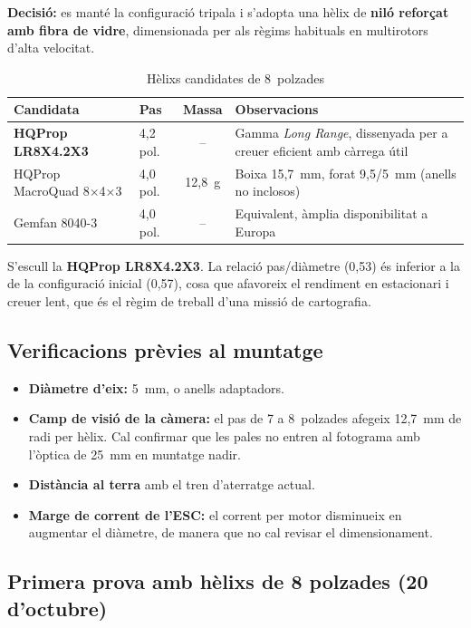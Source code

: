 \textbf{Decisió:} es manté la configuració tripala i s'adopta una hèlix de \textbf{niló reforçat amb fibra de vidre}, dimensionada per als règims habituals en multirotors d'alta velocitat.

\begin{table}[H]
    \centering
    \caption{Hèlixs candidates de 8~polzades}
    \label{tab:helix-candidates}
    \small
    \begin{tabular}{llcP{6.4cm}}
        \toprule
        Candidata & Pas & Massa & Observacions \\
        \midrule
        \textbf{HQProp LR8X4.2X3} & 4,2 pol. & -- & Gamma \emph{Long Range}, dissenyada per a creuer eficient amb càrrega útil \\
        HQProp MacroQuad 8$\times$4$\times$3 & 4,0 pol. & 12,8~g & Boixa 15,7~mm, forat 9,5/5~mm (anells no inclosos) \\
        Gemfan 8040-3 & 4,0 pol. & -- & Equivalent, àmplia disponibilitat a Europa \\
        \bottomrule
    \end{tabular}
\end{table}

S'escull la \textbf{HQProp LR8X4.2X3}. La relació pas/diàmetre (0,53) és inferior a la de la configuració inicial (0,57), cosa que afavoreix el rendiment en estacionari i creuer lent, que és el règim de treball d'una missió de cartografia.

\subsection{Verificacions prèvies al muntatge}
\label{subsec:propulsor-verificacions}

\begin{itemize}
    \item \textbf{Diàmetre d'eix:} 5~mm, o anells adaptadors.
    \item \textbf{Camp de visió de la càmera:} el pas de 7 a 8~polzades afegeix 12,7~mm de radi per hèlix. Cal confirmar que les pales no entren al fotograma amb l'òptica de 25~mm en muntatge nadir.
    \item \textbf{Distància al terra} amb el tren d'aterratge actual.
    \item \textbf{Marge de corrent de l'ESC:} el corrent per motor disminueix en augmentar el diàmetre, de manera que no cal revisar el dimensionament.
\end{itemize}

\subsection{Primera prova amb hèlixs de 8 polzades (20 d'octubre)}
\label{subsec:propulsor-8in}

